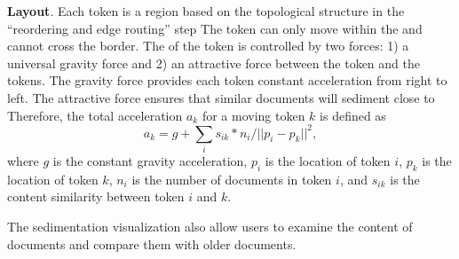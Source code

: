 \noindent \textbf{\normalsize Layout}.
Each token is  a region based on the topological structure in the ``reordering and edge routing'' step 
The token can only move within the  and cannot cross the border.
The  of the token is controlled by two forces: 1) a universal gravity force and 2) an attractive force between the token and the  tokens.
The gravity force provides each token  constant acceleration from right to left.
The attractive force ensures that similar documents will sediment close to 
Therefore, the total acceleration $a_k$ for a moving token $k$ is defined as
$$a_k=g+\sum_is_{ik}*{n_i}/{||p_i-p_k||^2},$$
where $g$ is the constant gravity acceleration, $p_i$ is the location of  token $i$, $p_k$ is the location of token $k$, $n_i$ is the number of documents in token $i$, and $s_{ik}$ is the content similarity between token $i$ and $k$.


\noindent \textbf{\normalsize {}}
The sedimentation visualization also allow users to examine the content of   documents  and compare them with older documents.

